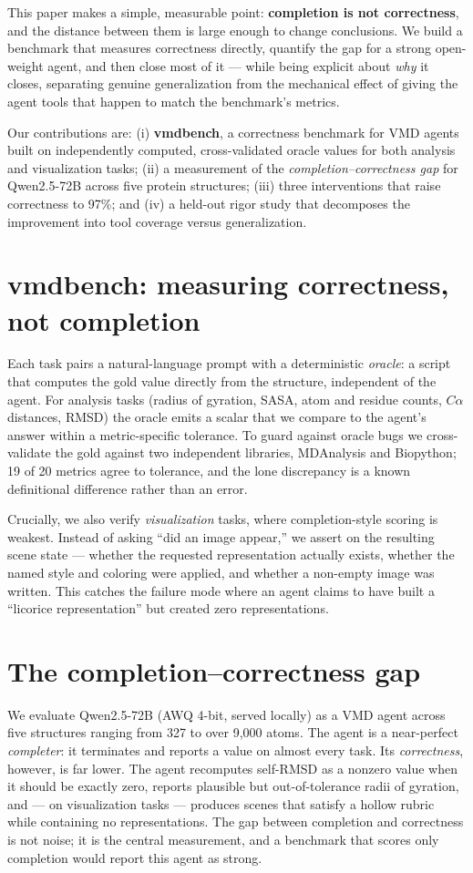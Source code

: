\documentclass[11pt]{article}
\begin{document}
This paper makes a simple, measurable point: \textbf{completion is not correctness}, and the
distance between them is large enough to change conclusions. We build a benchmark that measures
correctness directly, quantify the gap for a strong open-weight agent, and then close most of it
--- while being explicit about \emph{why} it closes, separating genuine generalization from the
mechanical effect of giving the agent tools that happen to match the benchmark's metrics.

Our contributions are: (i) \textbf{vmdbench}, a correctness benchmark for VMD agents built on
independently computed, cross-validated oracle values for both analysis and visualization tasks;
(ii) a measurement of the \emph{completion--correctness gap} for Qwen2.5-72B across five protein
structures; (iii) three interventions that raise correctness to 97\%; and (iv) a held-out rigor
study that decomposes the improvement into tool coverage versus generalization.

\section{vmdbench: measuring correctness, not completion}
Each task pairs a natural-language prompt with a deterministic \emph{oracle}: a script that
computes the gold value directly from the structure, independent of the agent. For analysis
tasks (radius of gyration, SASA, atom and residue counts, $C\alpha$ distances, RMSD) the oracle
emits a scalar that we compare to the agent's answer within a metric-specific tolerance. To
guard against oracle bugs we cross-validate the gold against two independent libraries,
MDAnalysis and Biopython; 19 of 20 metrics agree to tolerance, and the lone discrepancy is a
known definitional difference rather than an error.

Crucially, we also verify \emph{visualization} tasks, where completion-style scoring is weakest.
Instead of asking ``did an image appear,'' we assert on the resulting scene state --- whether the
requested representation actually exists, whether the named style and coloring were applied, and
whether a non-empty image was written. This catches the failure mode where an agent claims to
have built a ``licorice representation'' but created zero representations.

\section{The completion--correctness gap}
We evaluate Qwen2.5-72B (AWQ 4-bit, served locally) as a VMD agent across five structures
ranging from 327 to over 9{,}000 atoms. The agent is a near-perfect \emph{completer}: it
terminates and reports a value on almost every task. Its \emph{correctness}, however, is far
lower. The agent recomputes self-RMSD as a nonzero value when it should be exactly zero, reports
plausible but out-of-tolerance radii of gyration, and --- on visualization tasks --- produces
scenes that satisfy a hollow rubric while containing no representations. The gap between
completion and correctness is not noise; it is the central measurement, and a benchmark that
scores only completion would report this agent as strong.
\end{document}
